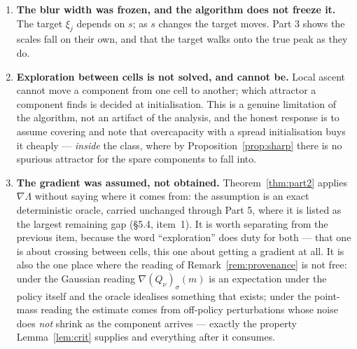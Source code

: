 \documentclass[11pt]{article}
\theoremstyle{definition}
\begin{document}
\begin{enumerate}[leftmargin=1.4em]
  It is worth being precise about \emph{which} best response each $\xi_j$ is,
  because the plural matters. By Lemma~\ref{lem:crit}(iv) each $\xi_j$ is the best
  response \emph{within its own cell}; at any given $\nu$ exactly one of the $M$
  is the global one, and the other $M-1$ are strictly worse. So Part 2 is not
  best-responding --- best-responding would want one peak, and a pure action
  attains it --- but tracking all $M$ local best responses at once. What makes the
  losers worth carrying is that at $\nu^\star$ they stop being losers: the atoms
  of an equilibrium strategy are \emph{all} best responses to $\nu^\star$ and are
  tied in value, which is the equalisation that Theorem~\ref{thm:part1} runs on.
  Away from $\nu^\star$ the low peaks are components being pre-positioned, and
  nothing in this part ever compares heights across cells --- which is why
  \S2.4 forbids extra attractors rather than merely requiring them to be
  dominated.
\item \textbf{The blur width was frozen, and the algorithm does not freeze it.}
  The target $\xi_j$ depends on $s$; as $s$ changes the target moves. Part 3
  shows the scales fall on their own, and that the target walks onto the true peak
  as they do.
\item \textbf{Exploration between cells is not solved, and cannot be.} Local
  ascent cannot move a component from one cell to another; which attractor a
  component finds is decided at initialisation. This is a genuine limitation of
  the algorithm, not an artifact of the analysis, and the honest response is to
  assume covering and note that overcapacity with a spread initialisation buys it
  cheaply --- \emph{inside} the class, where by Proposition~\ref{prop:sharp} there
  is no spurious attractor for the spare components to fall into.
\item \textbf{The gradient was assumed, not obtained.} Theorem~\ref{thm:part2}
  applies $\nabla\Lambda$ without saying where it comes from: the assumption is an
  exact deterministic oracle, carried unchanged through Part 5, where it is listed
  as the largest remaining gap (\S5.4, item~1). It is worth separating from the
  previous item, because the word ``exploration'' does duty for both --- that one
  is about crossing between cells, this one about getting a gradient at all. It is
  also the one place where the reading of Remark~\ref{rem:provenance} is not free:
  under the Gaussian reading $\nabla(Q_\nu)_\sigma(m)$ is an expectation under the
  policy itself and the oracle idealises something that exists; under the
  point-mass reading the estimate comes from off-policy perturbations whose noise
  does \emph{not} shrink as the component arrives --- exactly the property
  Lemma~\ref{lem:crit} supplies and everything after it consumes.
\end{enumerate}
\end{document}
